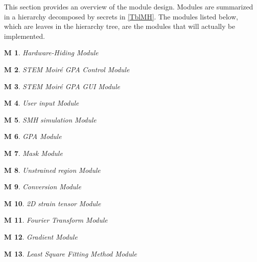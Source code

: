 \documentclass[12pt, titlepage]{article}
\newcommand{\progname}{STEM Moir{\'e} GPA}
\newtheorem{M}{M}
\begin{document}
This section provides an overview of the module design. Modules are summarized
in a hierarchy decomposed by secrets in \cref{TblMH}. The modules listed
below, which are leaves in the hierarchy tree, are the modules that will
actually be implemented.

\begin{M}\normalfont Hardware-Hiding Module
\label{M_Hardware}
\end{M}

\begin{M}\normalfont \progname{}  Control Module
\label{M_Control}
\end{M}

\begin{M}\normalfont \progname{} GUI Module
\label{M_GUISMG}
\end{M}

\begin{M}\normalfont User input Module
\label{M_InputFormat}
\end{M}

\begin{M}\normalfont SMH simulation Module
\label{M_SMHSim}
\end{M}

\begin{M}\normalfont GPA Module
\label{M_GPA}
\end{M}

\begin{M}\normalfont Mask Module
\label{M_Mask}
\end{M}

\begin{M}\normalfont Unstrained region Module
\label{M_URef}
\end{M}

\begin{M}\normalfont Conversion Module
\label{M_MtoCConv}
\end{M}

\begin{M}\normalfont 2D strain tensor Module
\label{M_StrainCalc}
\end{M}

\begin{M}\normalfont Fourier Transform Module
\label{M_FT}
\end{M}

\begin{M}\normalfont Gradient Module
\label{M_Gradient}
\end{M}

\begin{M}\normalfont Least Square Fitting Method Module
\label{M_LSFM}
\end{M}
\end{document}

